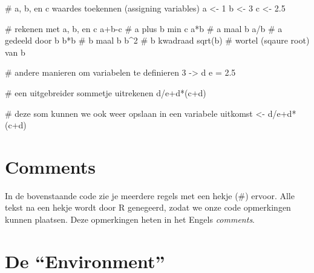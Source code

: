 \documentclass[
  b5paper,
  DIV=11,
  numbers=noendperiod]{scrreprt}
\newenvironment{Shaded}{\begin{snugshade}}{\end{snugshade}}
\newcommand{\CommentTok}[1]{\textcolor[rgb]{0.37,0.37,0.37}{#1}}
\newcommand{\DecValTok}[1]{\textcolor[rgb]{0.68,0.00,0.00}{#1}}
\newcommand{\FloatTok}[1]{\textcolor[rgb]{0.68,0.00,0.00}{#1}}
\newcommand{\FunctionTok}[1]{\textcolor[rgb]{0.28,0.35,0.67}{#1}}
\newcommand{\NormalTok}[1]{\textcolor[rgb]{0.00,0.23,0.31}{#1}}
\newcommand{\OtherTok}[1]{\textcolor[rgb]{0.00,0.23,0.31}{#1}}
\newcommand{\SpecialCharTok}[1]{\textcolor[rgb]{0.37,0.37,0.37}{#1}}
\theoremstyle{definition}
\theoremstyle{remark}
\begin{document}
\begin{Shaded}
\begin{Highlighting}[]
\CommentTok{\# a, b, en c waardes toekennen (assigning variables)}
\NormalTok{a }\OtherTok{\textless{}{-}} \DecValTok{1}
\NormalTok{b }\OtherTok{\textless{}{-}} \DecValTok{3}
\NormalTok{c }\OtherTok{\textless{}{-}} \FloatTok{2.5}

\CommentTok{\# rekenen met a, b, en c}
\NormalTok{a}\SpecialCharTok{+}\NormalTok{b}\SpecialCharTok{{-}}\NormalTok{c }\CommentTok{\# a plus b min c}
\NormalTok{a}\SpecialCharTok{*}\NormalTok{b  }\CommentTok{\# a maal b}
\NormalTok{a}\SpecialCharTok{/}\NormalTok{b  }\CommentTok{\# a gedeeld door b}
\NormalTok{b}\SpecialCharTok{*}\NormalTok{b  }\CommentTok{\# b maal b}
\NormalTok{b}\SpecialCharTok{\^{}}\DecValTok{2}  \CommentTok{\# b kwadraad}
\FunctionTok{sqrt}\NormalTok{(b) }\CommentTok{\# wortel (sqaure root) van b}


\CommentTok{\# andere manieren om variabelen te definieren}
\DecValTok{3} \OtherTok{{-}\textgreater{}}\NormalTok{ d}
\NormalTok{e }\OtherTok{=} \FloatTok{2.5}

\CommentTok{\# een uitgebreider sommetje uitrekenen}
\NormalTok{d}\SpecialCharTok{/}\NormalTok{e}\SpecialCharTok{+}\NormalTok{d}\SpecialCharTok{*}\NormalTok{(c}\SpecialCharTok{+}\NormalTok{d)}

\CommentTok{\# deze som kunnen we ook weer opslaan in een variabele}
\NormalTok{uitkomst }\OtherTok{\textless{}{-}}\NormalTok{ d}\SpecialCharTok{/}\NormalTok{e}\SpecialCharTok{+}\NormalTok{d}\SpecialCharTok{*}\NormalTok{(c}\SpecialCharTok{+}\NormalTok{d)}
\end{Highlighting}
\end{Shaded}

\section{Comments}\label{sec-environment}

In de bovenstaande code zie je meerdere regels met een hekje (\#)
ervoor. Alle tekst na een hekje wordt door R genegeerd, zodat we onze
code opmerkingen kunnen plaatsen. Deze opmerkingen heten in het Engels
\emph{comments}.

\section{De ``Environment''}\label{de-environment}
\end{document}
